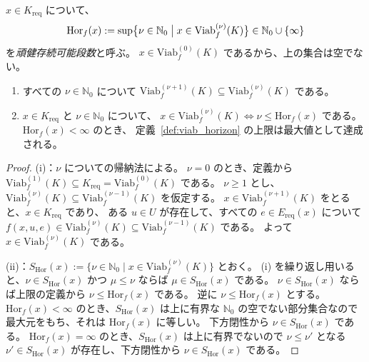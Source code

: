 \begin{definition}
\label{def:viab_horizon}
$x\in K_{\mathrm{req}}$ について、
\[
  \mathrm{Hor}_f(x)
  :=
  \sup
  \bigl\{
    \nu\in\mathbb{N}_0
    \bigm|
    x\in\mathrm{Viab}_f^{(\nu)}(K)
  \bigr\}
  \in\mathbb{N}_0\cup\{\infty\}
\]
を\emph{頑健存続可能段数}と呼ぶ。
$x\in\mathrm{Viab}_f^{(0)}(K)$ であるから、上の集合は空でない。
\end{definition}

\begin{proposition}[有限段頑健可行集合の入れ子性]
\label{prop:viab_stage_nested}
\begin{enumerate}[label=(\roman*)]
  \item すべての $\nu\in\mathbb{N}_0$ について
  $\mathrm{Viab}_f^{(\nu+1)}(K)\subseteq\mathrm{Viab}_f^{(\nu)}(K)$ である。
  \item $x\in K_{\mathrm{req}}$ と $\nu\in\mathbb{N}_0$ について、
  $x\in\mathrm{Viab}_f^{(\nu)}(K)\iff\nu\le\mathrm{Hor}_f(x)$ である。
  $\mathrm{Hor}_f(x)<\infty$ のとき、
  定義~\ref{def:viab_horizon} の上限は最大値として達成される。
\end{enumerate}
\end{proposition}

\begin{proof}
(i)：$\nu$ についての帰納法による。
$\nu=0$ のとき、定義から $\mathrm{Viab}_f^{(1)}(K)\subseteq K_{\mathrm{req}}=\mathrm{Viab}_f^{(0)}(K)$ である。
$\nu\ge1$ とし、$\mathrm{Viab}_f^{(\nu)}(K)\subseteq\mathrm{Viab}_f^{(\nu-1)}(K)$ を仮定する。
$x\in\mathrm{Viab}_f^{(\nu+1)}(K)$ をとると、$x\in K_{\mathrm{req}}$ であり、
ある $u\in U$ が存在して、すべての $e\in E_{\mathrm{req}}(x)$ について
$f(x,u,e)\in\mathrm{Viab}_f^{(\nu)}(K)\subseteq\mathrm{Viab}_f^{(\nu-1)}(K)$ である。
よって $x\in\mathrm{Viab}_f^{(\nu)}(K)$ である。

(ii)：$S_{\mathrm{Hor}}(x):=\{\nu\in\mathbb{N}_0\mid x\in\mathrm{Viab}_f^{(\nu)}(K)\}$ とおく。
(i) を繰り返し用いると、$\nu\in S_{\mathrm{Hor}}(x)$ かつ $\mu\le\nu$ ならば $\mu\in S_{\mathrm{Hor}}(x)$ である。
$\nu\in S_{\mathrm{Hor}}(x)$ ならば上限の定義から $\nu\le\mathrm{Hor}_f(x)$ である。
逆に $\nu\le\mathrm{Hor}_f(x)$ とする。
$\mathrm{Hor}_f(x)<\infty$ のとき、$S_{\mathrm{Hor}}(x)$ は上に有界な $\mathbb{N}_0$ の空でない部分集合なので
最大元をもち、それは $\mathrm{Hor}_f(x)$ に等しい。
下方閉性から $\nu\in S_{\mathrm{Hor}}(x)$ である。
$\mathrm{Hor}_f(x)=\infty$ のとき、$S_{\mathrm{Hor}}(x)$ は上に有界でないので
$\nu\le\nu'$ となる $\nu'\in S_{\mathrm{Hor}}(x)$ が存在し、下方閉性から $\nu\in S_{\mathrm{Hor}}(x)$ である。
\end{proof}

